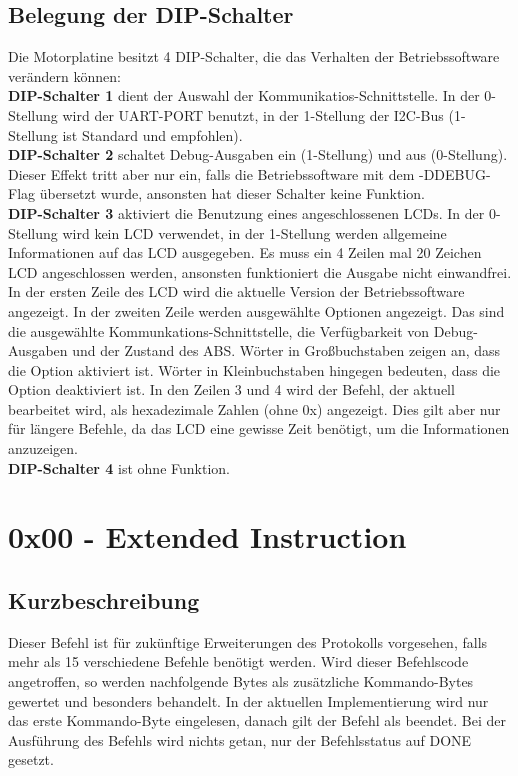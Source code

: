 \documentclass[a4paper]{article}
\begin{document}
	\subsection{Belegung der DIP-Schalter}

	Die Motorplatine besitzt 4 DIP-Schalter, die das Verhalten der Betriebssoftware
	verändern können:\\
	\textbf{DIP-Schalter 1} dient der Auswahl der Kommunikatios-Schnittstelle. In der
	0-Stellung wird der UART-PORT benutzt, in der 1-Stellung der I2C-Bus (1-Stellung ist
	Standard und empfohlen).\\
	\textbf{DIP-Schalter 2} schaltet Debug-Ausgaben ein (1-Stellung) und aus
	(0-Stellung). Dieser Effekt tritt aber nur ein, falls die Betriebssoftware mit dem
	-DDEBUG-Flag übersetzt wurde, ansonsten hat dieser Schalter keine Funktion.\\
	\textbf{DIP-Schalter 3} aktiviert die Benutzung eines angeschlossenen LCDs. In der
	0-Stellung wird kein LCD verwendet, in der 1-Stellung werden allgemeine Informationen
	auf das LCD ausgegeben. Es muss ein 4 Zeilen mal 20 Zeichen LCD angeschlossen werden,
	ansonsten funktioniert die Ausgabe nicht einwandfrei. In der ersten Zeile des LCD
	wird die aktuelle Version der Betriebssoftware angezeigt. In der zweiten Zeile werden
	ausgewählte Optionen angezeigt. Das sind die ausgewählte Kommunkations-Schnittstelle,
	die Verfügbarkeit von Debug-Ausgaben und der Zustand des ABS. Wörter in Großbuchstaben
	zeigen an, dass die Option aktiviert ist. Wörter in Kleinbuchstaben hingegen bedeuten,
	dass die Option deaktiviert ist. In den Zeilen 3 und 4 wird der Befehl, der aktuell
	bearbeitet wird, als hexadezimale Zahlen (ohne 0x) angezeigt. Dies gilt aber nur
	für längere Befehle, da das LCD eine gewisse Zeit benötigt, um die Informationen
	anzuzeigen.\\
	\textbf{DIP-Schalter 4} ist ohne Funktion.

	\pagebreak


	\section{0x00 - Extended Instruction}

	\subsection{Kurzbeschreibung}

	Dieser Befehl ist für zukünftige Erweiterungen des Protokolls vorgesehen,
	falls mehr als 15 verschiedene Befehle benötigt werden. Wird dieser
	Befehlscode angetroffen, so werden nachfolgende Bytes als zusätzliche
	Kommando-Bytes gewertet und besonders behandelt. In der aktuellen
	Implementierung wird nur das erste Kommando-Byte eingelesen, danach gilt der
	Befehl als beendet. Bei der	Ausführung des Befehls wird nichts getan,
	nur der Befehlsstatus auf DONE gesetzt.
\end{document}
